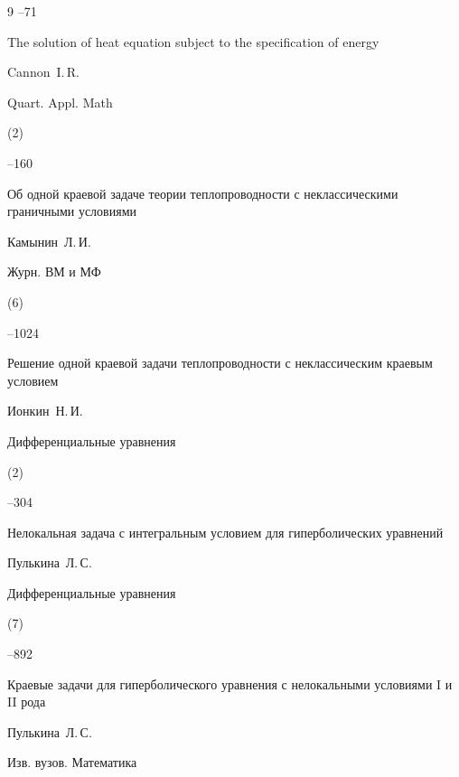 \begin{thebibliography}{9}
--71




\paper The solution of heat equation subject to the specification of energy

\by Cannon~I.\,R.

\jour Quart. Appl. Math


(2)

--160




\paper Об одной краевой задаче теории теплопроводности с неклассическими граничными условиями

\by Камынин~Л.\,И.

\jour Журн. ВМ и МФ


(6)

--1024




\paper Решение одной краевой задачи теплопроводности с неклассическим краевым условием

\by Ионкин~Н.\,И.

\jour Дифференциальные уравнения


(2)

--304




\paper Нелокальная задача с интегральным условием для гиперболических уравнений

\by Пулькина~Л.\,С.

\jour Дифференциальные уравнения


(7)

--892




\paper Краевые задачи для гиперболического уравнения с нелокальными условиями I и II рода

\by Пулькина~Л.\,С.

\jour Изв. вузов. Математика




\end{thebibliography}
